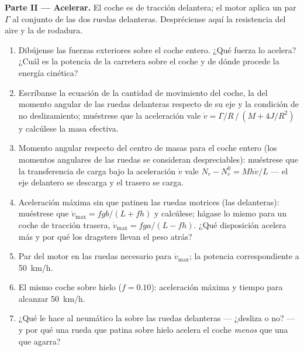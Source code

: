 \begin{problem}
\medskip
\noindent\textbf{Parte II --- Acelerar.}
El coche es de tracción delantera; el motor aplica un par $\Gamma$ al
conjunto de las dos ruedas delanteras. Despréciense aquí la resistencia del aire y la de rodadura.
\begin{enumerate}[resume]
  \item Dibújense las fuerzas exteriores sobre el coche entero. ¿Qué
        fuerza lo acelera? ¿Cuál es la potencia de la carretera sobre el
        coche y de dónde procede la energía cinética?
  \item Escríbanse la ecuación de la cantidad de movimiento del coche, la
        del momento angular de las ruedas delanteras respecto de su eje y
        la condición de no deslizamiento; muéstrese que la aceleración
        vale $\dot v =
        \Gamma/R\,/\,(M + 4J/R^2)$ y calcúlese la masa efectiva.
  \item Momento angular respecto del centro de masas para el coche entero
        (los momentos angulares de las ruedas se consideran
        despreciables): muéstrese que la transferencia de carga bajo la
        aceleración $\dot v$ vale $N_r - N_r^0 =
        Mh\dot v/L$ --- el eje delantero se descarga y el trasero se carga.
  \item Aceleración máxima sin que patinen las ruedas motrices (las
        delanteras): muéstrese que $\dot v_{\max} = fgb/(L + fh)$ y
        calcúlese; hágase lo mismo para un coche de tracción trasera,
        $\dot v_{\max} =
        fga/(L - fh)$. ¿Qué disposición acelera más y por qué los dragsters
        llevan el peso atrás?
  \item Par del motor en las ruedas necesario para $\dot v_{\max}$; la
        potencia correspondiente a \qty{50}{km/h}.
  \item El mismo coche sobre hielo ($f = 0.10$): aceleración máxima y
        tiempo para alcanzar \qty{50}{km/h}.
  \item ¿Qué le hace al neumático la  sobre las ruedas
        delanteras --- ¿desliza o no? --- y por qué una rueda que patina
        sobre hielo acelera el coche \emph{menos} que una que agarra?
\end{enumerate}


\end{problem}
